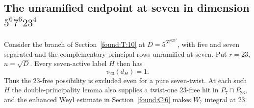 \documentclass[11pt,a4paper]{article}
\numberwithin{equation}{section}
\theoremstyle{remark}
\begin{document}
\subsection{The unramified endpoint at seven in dimension \texorpdfstring{$5^6 7^6 23^4$}{5\string^6 7\string^6 23\string^4}}
\label{por:sect:odd-seven}
Consider the branch of Section~\ref{found:T:10} at $D=5^67^623^4$, with five and seven separated and the complementary principal rows unramified at seven. Put $r=23$, $n=\sqrt D$. Every seven-active label $H$ then has
\[
                         v_{23}(d_H)=1 .
\]
Thus the $23$-free possibility is excluded even for a pure seven-twist. At each such $H$ the double-principality lemma also supplies a twist-one $23$-free hit in $P_7\cap P_{23}$, and the enhanced Weyl estimate in Section~\ref{found:C:6} makes $W_7$ integral at $23$.
\end{document}
